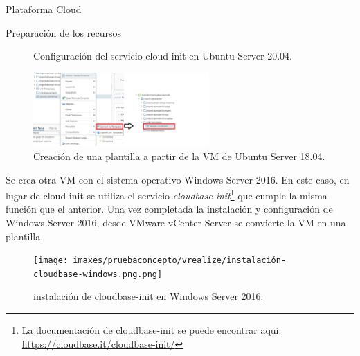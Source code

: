 \begin{subsection}{Plataforma Cloud}
\begin{subsubsection}{Preparación de los recursos}
\begin{figure}[h]
        \caption{Configuración del servicio cloud-init en Ubuntu Server 20.04.}
        \label{fig:cloud-init-config}
    \end{figure}
    \FloatBarrier
    \begin{figure}[h]
        \centering
        \includegraphics[width=0.6\textwidth]{imaxes/pruebaconcepto/vrealize/convert-to-template-Ubuntu.png}
        \caption{Creación de una plantilla a partir de la VM de Ubuntu Server 18.04.}
        \label{fig:template-ubuntu}
    \end{figure}
    \FloatBarrier
    Se crea otra VM con el sistema operativo Windows Server 2016. En este caso, en lugar de cloud-init se utiliza el servicio \textit{cloudbase-init}\footnote{La documentación de cloudbase-init se puede encontrar aquí: \url{https://cloudbase.it/cloudbase-init/}} que cumple la misma función que el anterior. Una vez completada la instalación y configuración de Windows Server 2016, desde VMware vCenter Server se convierte la VM en una plantilla.
    \begin{figure}[h]
        \centering
        \texttt{[image: imaxes/pruebaconcepto/vrealize/instalación-cloudbase-windows.png.png]}
        \caption{instalación de cloudbase-init en Windows Server 2016.}
        \label{fig:cloudbase-init}
    \end{figure}
    \FloatBarrier 

    \end{subsubsection}


\end{subsection}
